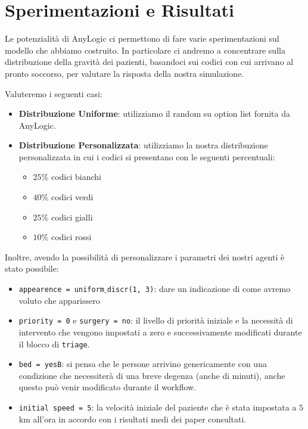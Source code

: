 \chapter{Sperimentazioni e Risultati} \label{chap:sper}
Le potenzialità di AnyLogic ci permettono di fare varie sperimentazioni sul modello
che abbiamo costruito. In particolare ci andremo a concentrare sulla distribuzione 
della gravità dei pazienti, basandoci sui codici con cui arrivano al pronto soccorso, per valutare la risposta della nostra simulazione.

Valuteremo i seguenti casi:
\begin{itemize}
    \item \textbf{Distribuzione Uniforme}: utilizziamo il random su option list fornita da AnyLogic.
    \item \textbf{Distribuzione Personalizzata}: utilizziamo la nostra distribuzione personalizzata in cui i codici si presentano con le seguenti percentuali:
    \begin{itemize}
        \item $25\%$ codici bianchi
        \item $40\%$ codici verdi
        \item $25\%$ codici gialli
        \item $10\%$ codici rossi
    \end{itemize}
\end{itemize}

\clearpage
Inoltre, avendo la possibilità di personalizzare i parametri dei nostri agenti è stato possibile:
\begin{itemize}
    \item  \texttt{appearence = uniform${\_}$discr(1, 3)}: dare un indicazione di come avremo voluto che apparissero
    \item \texttt{priority = 0} e \texttt{surgery = no}: il livello di priorità iniziale e la necessità di intervento che vengono impostati a zero e successivamente modificati durante il blocco di \texttt{triage}.
    \item \texttt{bed = yesB}: si pensa che le persone arrivino genericamente con una condizione che necessiterà di una breve degenza (anche di minuti), anche questo può venir modificato durante il workflow.
    \item \texttt{initial speed = 5}: la velocità iniziale del paziente che è stata impostata a $5$km all'ora in accordo con i risultati medi dei paper consultati.
\end{itemize}

